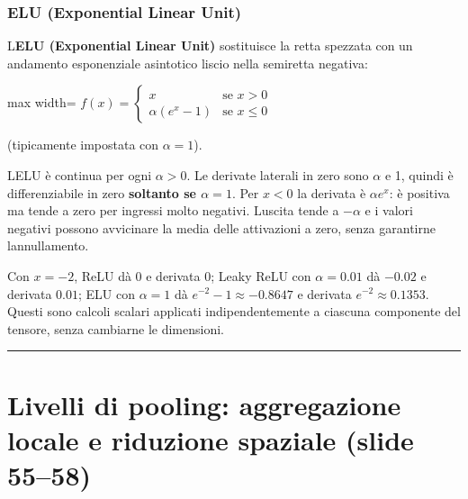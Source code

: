 \documentclass[11pt,a4paper,oneside,openany]{book}
\begin{document}
\subsubsection{ELU (Exponential Linear Unit)}\label{f02-r786}

L\textquotesingle{}\textbf{ELU (Exponential Linear Unit)} sostituisce la retta spezzata con un andamento esponenziale asintotico liscio nella semiretta negativa:

\begin{center}
\begin{adjustbox}{max width=\linewidth}
$\displaystyle 
\boxed{f(x) = \begin{cases} x & \text{se } x > 0 \\ \alpha (e^x - 1) & \text{se } x \le 0 \end{cases}}
$
\end{adjustbox}
\end{center}

(tipicamente impostata con \(\alpha = 1\)).

L\textquotesingle ELU è continua per ogni \(\alpha>0\). Le derivate laterali in zero sono \(\alpha\) e 1, quindi è differenziabile in zero \textbf{soltanto se \(\alpha=1\)}. Per \(x<0\) la derivata è \(\alpha e^x\): è positiva ma tende a zero per ingressi molto negativi. L\textquotesingle uscita tende a \(-\alpha\) e i valori negativi possono avvicinare la media delle attivazioni a zero, senza garantirne l\textquotesingle annullamento.

Con \(x=-2\), ReLU dà \(0\) e derivata \(0\); Leaky ReLU con \(\alpha=0.01\) dà \(-0.02\) e derivata \(0.01\); ELU con \(\alpha=1\) dà \(e^{-2}-1\approx-0.8647\) e derivata \(e^{-2}\approx0.1353\). Questi sono calcoli scalari applicati indipendentemente a ciascuna componente del tensore, senza cambiarne le dimensioni.

\begin{center}\rule{0.5\linewidth}{0.5pt}\end{center}

\section{Livelli di pooling: aggregazione locale e riduzione spaziale (slide 55--58)}\label{f02-r802}
\end{document}

